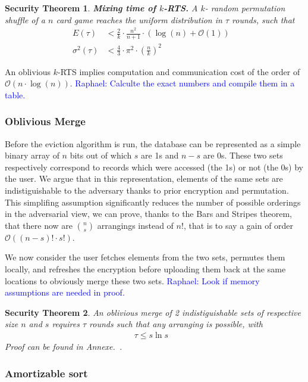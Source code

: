 \documentclass[a4paper]{article}
\newtheorem{secthm}{Security Theorem}
\newcommand{\raphael}[1]{\textcolor{blue}{Raphael: #1}}
\begin{document}
\begin{secthm}
\textbf{Mixing time of $k$-RTS.} A $k$- random permutation shuffle of a $n$ card game reaches the uniform distribution in $\tau$ rounds, such that
\begin{align*}
E(\tau) &< \frac{2}{k}\cdot\frac{n^2}{n+1}\cdot \left ( \log(n) + \mathcal{O}(1) \right ) &\\
\sigma^2(\tau) &< \frac{4}{3} \cdot {\pi}^2 \cdot \left ( \frac{n}{k} \right )^2 &
\end{align*}
\end{secthm}

An oblivious $k$-RTS implies computation and communication cost of the order of $\mathcal{O} \left(n\cdot \log(n)\right)$.
\raphael{Calculte the exact numbers and compile them in a table.}

\subsubsection{Oblivious Merge}
Before the eviction algorithm is run, the database can be represented as a simple binary array of $n$ bits out of which $s$ are 1s and $n-s$ are 0s. These two sets respectively correspond to records which were accessed (the 1s) or not (the 0s) by the user.
We argue that in this representation, elements of the same sets are indistiguishable to the adversary thanks to prior encryption and permutation.
This simplifing assumption significantly reduces the number of possible orderings in the adversarial view, we can prove, thanks to the Bars and Stripes theorem, that there now are ${n \choose s}$ arrangings instead of $n!$, that is to say a gain of order $\mathcal{O}\left ( (n-s)!\cdot s!\right )$.

We now consider the user fetches elements from the two sets, permutes them locally, and refreshes the encryption before uploading them back at the same locations to obviously merge these two sets.
\raphael{Look if memory assumptions are needed in proof.}

\begin{secthm}
An oblivious merge of 2 indistiguishable sets of respective size $n$ and $s$ requires $\tau$ rounds such that any arranging is possible, with
\begin{align*}
\tau \leq s \ln{s}&
\end{align*}
Proof can be found in Annexe.~\cite{}.
\end{secthm}

\subsubsection{Amortizable sort}
\end{document}
